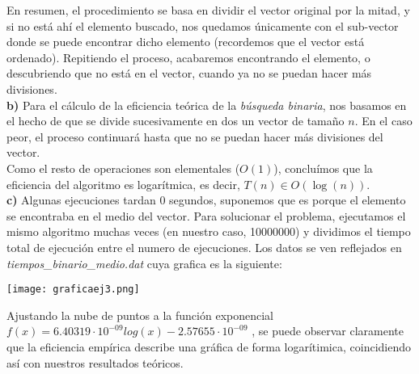 \documentclass[11pt,a4paper]{article}
\begin{document}
En resumen, el procedimiento se basa en dividir el vector original por la mitad, y si no está ahí el elemento buscado, nos quedamos únicamente con el sub-vector donde se puede encontrar dicho elemento (recordemos que el vector está ordenado). Repitiendo el proceso, acabaremos encontrando el elemento, o descubriendo que no está en el vector, cuando ya no se puedan hacer más divisiones.\\

\textbf{b)} Para el cálculo de la eficiencia teórica de la \textit{búsqueda binaria}, nos basamos en el hecho de que se divide sucesivamente en dos un vector de tamaño $n$. En el caso peor, el proceso continuará hasta que no se puedan hacer más divisiones del vector.\\

Como el resto de operaciones son elementales ($O(1)$), concluímos que la eficiencia del algoritmo es logarítmica, es decir, $T(n) \in O(\log (n))$. \\

\textbf{c)} Algunas ejecuciones tardan 0 segundos, suponemos que es porque el elemento se encontraba en el medio del vector.  Para solucionar el problema, ejecutamos el mismo algoritmo muchas veces (en nuestro caso, 10000000) y dividimos el tiempo total de ejecución entre el numero de ejecuciones. Los datos se ven reflejados en \textit{tiempos\_binario\_medio.dat} cuya grafica es la siguiente: \\


\begin{center}
	\texttt{[image: graficaej3.png]}
\end{center}

Ajustando la nube de puntos a la función exponencial $f(x) = {6.40319 \cdot 10^{-09}log (x) - 2.57655 \cdot 10^{-09}}$ , se puede observar claramente que la eficiencia empírica describe una gráfica de forma logarítimica, coincidiendo así con nuestros resultados teóricos.
\end{document}
